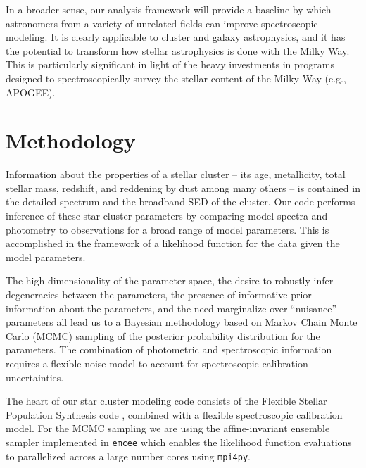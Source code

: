 \documentclass[11pt,preprint]{aastex}
\begin{document}
In a broader sense, our analysis framework will provide a baseline by which astronomers from a variety of unrelated fields can improve spectroscopic modeling.  It is clearly applicable to cluster and galaxy astrophysics, and it has the potential to transform how stellar astrophysics is done with the Milky Way. This is particularly significant in light of the heavy investments in programs designed to spectroscopically survey the stellar content of the Milky Way (e.g., APOGEE).


\section{Methodology}

Information about the properties of a stellar cluster -- its age, metallicity, total stellar mass, redshift, and reddening by dust among many others -- is contained in the detailed spectrum and the broadband SED of the cluster. 
Our code performs inference of these star cluster parameters by comparing model spectra and photometry to observations for a broad range of model parameters.  
This is accomplished in the framework of a likelihood function for the data given the model parameters.  

The high dimensionality of the parameter space, the desire to robustly infer degeneracies between the parameters, the presence of informative prior information about the parameters, and the need marginalize over ``nuisance'' parameters all lead us to a Bayesian methodology based on Markov Chain Monte Carlo (MCMC) sampling of the posterior probability distribution for the parameters. 
The combination of photometric and spectroscopic information requires a flexible noise model to account for spectroscopic calibration uncertainties.

The heart of our star cluster modeling code consists of the Flexible Stellar Population Synthesis code \citep[FSPS; written by co-I Conroy][]{fspsI, fspsIII}, combined with a flexible spectroscopic calibration model.  
For the MCMC sampling we are using the affine-invariant ensemble sampler implemented in \texttt{emcee} \citep{emcee} which enables the likelihood function evaluations to parallelized across a large number cores using \texttt{mpi4py}. 
\end{document}
